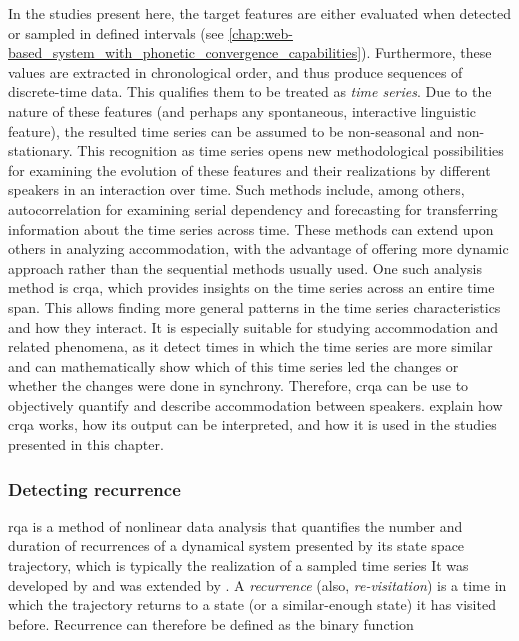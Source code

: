 In the studies present here, the target features are either evaluated when detected or sampled in defined intervals (see \cref{chap:web-based_system_with_phonetic_convergence_capabilities}).
Furthermore, these values are extracted in chronological order, and thus produce sequences of discrete-time data.
This qualifies them to be treated as \emph{time series}.
Due to the nature of these features (and perhaps any spontaneous, interactive linguistic feature), the resulted time series can be assumed to be non-seasonal and non-stationary.
This recognition as time series opens new methodological possibilities for examining the evolution of these features and their realizations by different speakers in an interaction over time.
Such methods include, among others, autocorrelation for examining serial dependency and forecasting for transferring information about the time series across time.
These methods can extend upon others in analyzing accommodation, with the advantage of offering more dynamic approach rather than the sequential methods usually used.
One such analysis method is \acf{crqa}, which provides insights on the time series across an entire time span.
This allows finding more general patterns in the time series characteristics and how they interact.
It is especially suitable for studying accommodation and related phenomena, as it detect times in which the time series are more similar and can mathematically show which of this time series led the changes or whether the changes were done in synchrony.
Therefore, \ac{crqa} can be use to objectively quantify and describe accommodation between speakers.
 explain how \ac{crqa} works, how its output can be interpreted, and how it is used in the studies presented in this chapter.

\subsubsection{Detecting recurrence}
\label{subsubsec:detecting_recurrence}

\Ac{rqa} is a method of nonlinear data analysis that quantifies the number and duration of recurrences of a dynamical system presented by its state space trajectory, which is typically the realization of a sampled time series
It was developed by \citet{Zbilut1992embeddings} and was extended by \citet{Webber2005recurrence,Marwan2002cross}.
A \emph{recurrence} (also, \emph{re-visitation}) is a time in which the trajectory returns to a state (or a similar-enough state) it has visited before.
Recurrence can therefore be defined as the binary function


